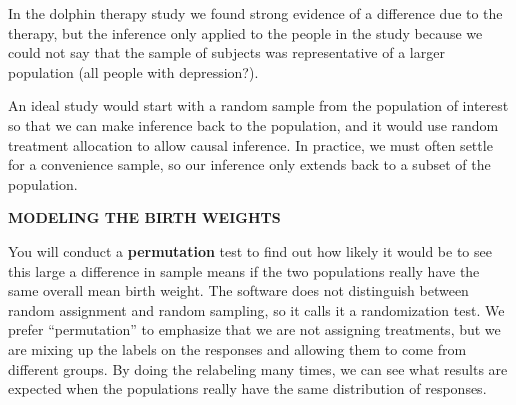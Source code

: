 In the  dolphin therapy study we found strong evidence of a
difference due to the therapy, but the inference only applied to the
people in the study because we could not say that the sample of
subjects was representative of a larger population (all people with
depression?). 

An ideal study would start with a random sample from the population of
interest so that we can make inference back to the population, and it
would use random treatment allocation to allow causal inference. In
practice, we must often settle for a convenience sample, so our
inference only extends back to a subset of the population.   


{\bf MODELING THE BIRTH WEIGHTS}

You will conduct a {\bf permutation} test to find out how likely it would
be to see this large a difference in sample means if the two
populations really have the same overall mean birth weight.  The software
does not distinguish between random assignment and 
random sampling, so it calls it a randomization test.  We prefer
``permutation'' to emphasize that we are not assigning treatments, but
we are mixing up the labels on the responses and allowing them to come from
different groups.  By doing the relabeling many times, we can see what
results are expected when the populations really have the same
distribution of responses. 

